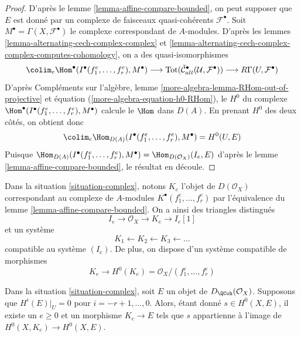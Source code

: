 \begin{proof}
D'après le lemme \ref{lemma-affine-compare-bounded}, on peut supposer que $E$
est donné par un complexe de faisceaux quasi-cohérents $\mathcal{F}^\bullet$.
Soit $M^\bullet = \Gamma(X, \mathcal{F}^\bullet)$ le complexe correspondant
de $A$-modules. D'après
les lemmes \ref{lemma-alternating-cech-complex-complex} et
\ref{lemma-alternating-cech-complex-complex-computes-cohomology},
on a des quasi-isomorphismes
$$
\colim_e \Hom^\bullet(I^\bullet(f_1^e, \ldots, f_r^e), M^\bullet)
\longrightarrow
\text{Tot}(\check{\mathcal{C}}_{alt}^\bullet(\mathcal{U}, \mathcal{F}^\bullet))
\longrightarrow
R\Gamma(U, \mathcal{F}^\bullet)
$$
D'après Compléments sur l'algèbre, lemme \ref{more-algebra-lemma-RHom-out-of-projective} et
équation (\ref{more-algebra-equation-h0-RHom}),
le $H^0$ du complexe
$\Hom^\bullet(I^\bullet(f_1^e, \ldots, f_r^e), M^\bullet)$
calcule le $\Hom$ dans $D(A)$. En prenant $H^0$ des deux côtés, on obtient donc
$$
\colim_e \Hom_{D(A)}(I^\bullet(f_1^e, \ldots, f_r^e), M^\bullet)
=
H^0(U, E)
$$
Puisque $\Hom_{D(A)}(I^\bullet(f_1^e, \ldots, f_r^e), M^\bullet) =
\Hom_{D(\mathcal{O}_X)}(I_e, E)$ d'après
le lemme \ref{lemma-affine-compare-bounded}, le résultat en découle.
\end{proof}

\noindent
Dans la situation \ref{situation-complex}, notons $K_e$ l'objet de
$D(\mathcal{O}_X)$ correspondant au complexe de $A$-modules
$K^\bullet(f_1^e, \ldots, f_r^e)$ par l'équivalence du
lemme \ref{lemma-affine-compare-bounded}. On a ainsi des triangles
distingués
$$
I_e \to \mathcal{O}_X \to K_e \to I_e[1]
$$
et un système
$$
K_1 \leftarrow
K_2 \leftarrow
K_3 \leftarrow \ldots
$$
compatible au système $(I_e)$.
De plus, on dispose d'un système compatible de morphismes
$$
K_e \to H^0(K_e) = \mathcal{O}_X/(f_1^e, \ldots, f_r^e)
$$

\begin{lemma}
\label{lemma-represent-cohomology-class-on-closed}
Dans la situation \ref{situation-complex}, soit $E$ un objet de
$D_\QCoh(\mathcal{O}_X)$.
Supposons que $H^i(E)|_U = 0$ pour $i = - r + 1, \ldots, 0$.
Alors, étant donné $s \in H^0(X, E)$, il existe un $e \geq 0$ et
un morphisme $K_e \to E$ tels que $s$ appartienne à l'image de
$H^0(X, K_e) \to H^0(X, E)$.
\end{lemma}


